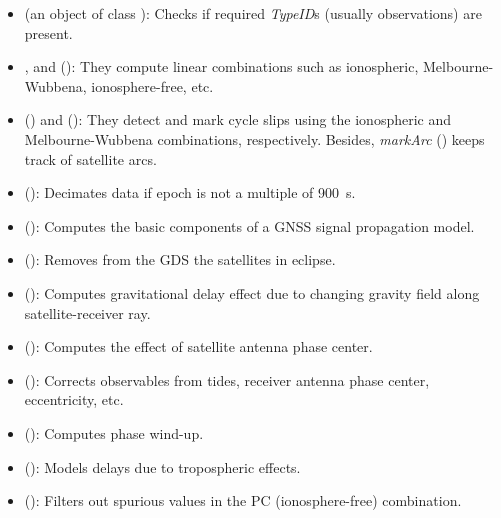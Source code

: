 \begin{itemize}

\item {} (an object of class ): Checks if required
{\it TypeID}s (usually observations) are present.

\item {},  and 
(): They compute linear combinations such as
ionospheric, Melbourne-Wubbena, ionosphere-free, etc.

\item {} () and 
(): They detect and mark cycle slips using the
ionospheric and Melbourne-Wubbena combinations, respectively. Besides,
{\it markArc} () keeps track of satellite arcs.

\item {} (): Decimates data if epoch is not
a multiple of 900~s.

\item {} (): Computes the basic components
of a GNSS signal propagation model.

\item {} (): Removes from the GDS
the satellites in eclipse.

\item {} (): Computes gravitational
delay effect due to changing gravity field along satellite-receiver ray.

\item {} (): Computes the effect of
satellite antenna phase center.

\item {} (): Corrects observables from
tides, receiver antenna phase center, eccentricity, etc.

\item {} (): Computes phase wind-up.

\item {} (): Models delays due to
tropospheric effects.

\item {} (): Filters out spurious values in
the PC (ionosphere-free) combination.


\end{itemize}

